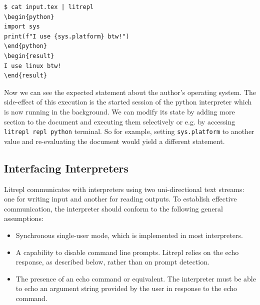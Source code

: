 \documentclass[letterpaper,12pt,twocolumn]{article}
\begin{document}

\begin{verbatim}
$ cat input.tex | litrepl
\begin{python}
import sys
print(f"I use {sys.platform} btw!")
\end{python}
\begin{result}
I use linux btw!
\end{result}
\end{verbatim}

Now we can see the expected statement about the author's operating system.  The
side-effect of this execution is the started session of the python interpreter
which is now running in the background. We can modify its state by adding more
section to the document and executing them selectively or e.g. by accessing
\verb|litrepl repl python| terminal. So for example, setting \verb|sys.platform|
to another value and re-evaluating the document would yield a different
statement.


\subsection{Interfacing Interpreters}

Litrepl communicates with interpreters using two uni-directional text streams:
one for writing input and another for reading outputs. To establish effective
communication, the interpreter should conform to the following general
assumptions:

\begin{itemize}
  \item Synchronous single-user mode, which is implemented in most interpreters.
  \item A capability to disable command line prompts. Litrepl relies on the echo
        response, as described below, rather than on prompt detection.
  \item The presence of an echo command or equivalent. The interpreter must be
        able to echo an argument string provided by the user in response to the
        echo command.
\end{itemize}
\end{document}
